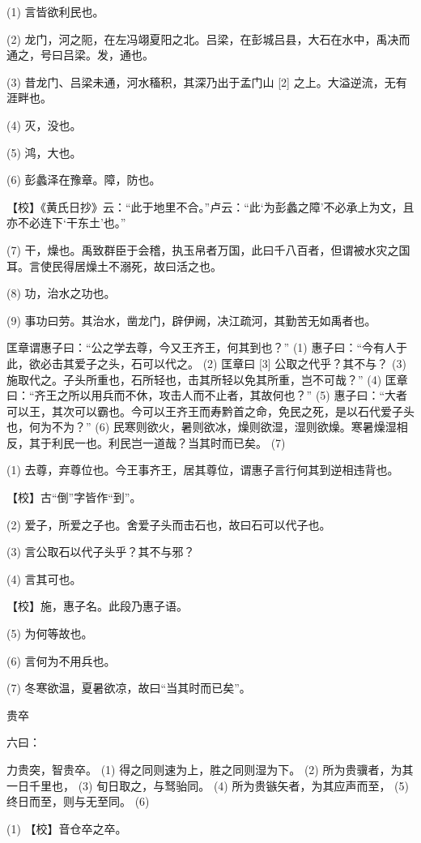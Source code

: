 \documentclass[12pt,UTF8]{ctexbook}
\begin{document}
(1) 言皆欲利民也。

(2) 龙门，河之阨，在左冯翊夏阳之北。吕梁，在彭城吕县，大石在水中，禹决而通之，号曰吕梁。发，通也。

(3) 昔龙门、吕梁未通，河水稸积，其深乃出于孟门山 [2] 之上。大溢逆流，无有涯畔也。

(4) 灭，没也。

(5) 鸿，大也。

(6) 彭蠡泽在豫章。障，防也。

【校】《黄氏日抄》云：“此于地里不合。”卢云：“此‘为彭蠡之障’不必承上为文，且亦不必连下‘干东土’也。”

(7) 干，燥也。禹致群臣于会稽，执玉帛者万国，此曰千八百者，但谓被水灾之国耳。言使民得居燥土不溺死，故曰活之也。

(8) 功，治水之功也。

(9) 事功曰劳。其治水，凿龙门，辟伊阙，决江疏河，其勤苦无如禹者也。

匡章谓惠子曰：“公之学去尊，今又王齐王，何其到也？” (1) 惠子曰：“今有人于此，欲必击其爱子之头，石可以代之。 (2) 匡章曰 [3] 公取之代乎？其不与？ (3) 施取代之。子头所重也，石所轻也，击其所轻以免其所重，岂不可哉？” (4) 匡章曰：“齐王之所以用兵而不休，攻击人而不止者，其故何也？” (5) 惠子曰：“大者可以王，其次可以霸也。今可以王齐王而寿黔首之命，免民之死，是以石代爱子头也，何为不为？” (6) 民寒则欲火，暑则欲冰，燥则欲湿，湿则欲燥。寒暑燥湿相反，其于利民一也。利民岂一道哉？当其时而已矣。 (7)

(1) 去尊，弃尊位也。今王事齐王，居其尊位，谓惠子言行何其到逆相违背也。

【校】古“倒”字皆作“到”。

(2) 爱子，所爱之子也。舍爱子头而击石也，故曰石可以代子也。

(3) 言公取石以代子头乎？其不与邪？

(4) 言其可也。

【校】施，惠子名。此段乃惠子语。

(5) 为何等故也。

(6) 言何为不用兵也。

(7) 冬寒欲温，夏暑欲凉，故曰“当其时而已矣”。





贵卒


六曰：

力贵突，智贵卒。 (1) 得之同则速为上，胜之同则湿为下。 (2) 所为贵骥者，为其一日千里也， (3) 旬日取之，与驽骀同。 (4) 所为贵镞矢者，为其应声而至， (5) 终日而至，则与无至同。 (6)

(1) 【校】音仓卒之卒。
\end{document}
